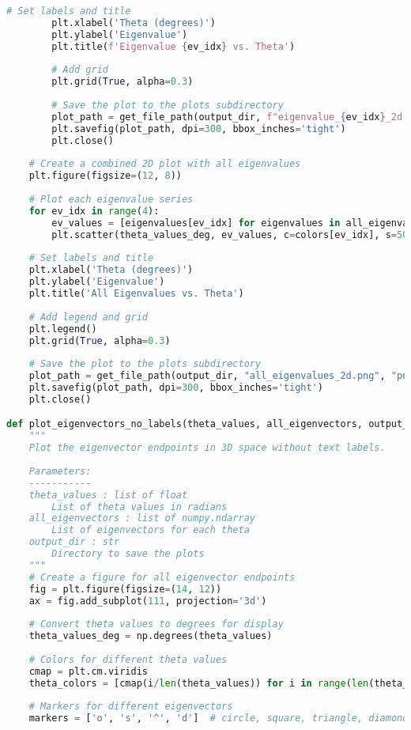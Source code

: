 \begin{lstlisting}[language=Python]
        # Set labels and title
        plt.xlabel('Theta (degrees)')
        plt.ylabel('Eigenvalue')
        plt.title(f'Eigenvalue {ev_idx} vs. Theta')
        
        # Add grid
        plt.grid(True, alpha=0.3)
        
        # Save the plot to the plots subdirectory
        plot_path = get_file_path(output_dir, f"eigenvalue_{ev_idx}_2d.png", "png")
        plt.savefig(plot_path, dpi=300, bbox_inches='tight')
        plt.close()
    
    # Create a combined 2D plot with all eigenvalues
    plt.figure(figsize=(12, 8))
    
    # Plot each eigenvalue series
    for ev_idx in range(4):
        ev_values = [eigenvalues[ev_idx] for eigenvalues in all_eigenvalues]
        plt.scatter(theta_values_deg, ev_values, c=colors[ev_idx], s=50, label=f'Eigenvalue {ev_idx}')
    
    # Set labels and title
    plt.xlabel('Theta (degrees)')
    plt.ylabel('Eigenvalue')
    plt.title('All Eigenvalues vs. Theta')
    
    # Add legend and grid
    plt.legend()
    plt.grid(True, alpha=0.3)
    
    # Save the plot to the plots subdirectory
    plot_path = get_file_path(output_dir, "all_eigenvalues_2d.png", "png")
    plt.savefig(plot_path, dpi=300, bbox_inches='tight')
    plt.close()

def plot_eigenvectors_no_labels(theta_values, all_eigenvectors, output_dir="./results"):
    """
    Plot the eigenvector endpoints in 3D space without text labels.
    
    Parameters:
    -----------
    theta_values : list of float
        List of theta values in radians
    all_eigenvectors : list of numpy.ndarray
        List of eigenvectors for each theta
    output_dir : str
        Directory to save the plots
    """
    # Create a figure for all eigenvector endpoints
    fig = plt.figure(figsize=(14, 12))
    ax = fig.add_subplot(111, projection='3d')
    
    # Convert theta values to degrees for display
    theta_values_deg = np.degrees(theta_values)
    
    # Colors for different theta values
    cmap = plt.cm.viridis
    theta_colors = [cmap(i/len(theta_values)) for i in range(len(theta_values))]
    
    # Markers for different eigenvectors
    markers = ['o', 's', '^', 'd']  # circle, square, triangle, diamond
    

\end{lstlisting}
